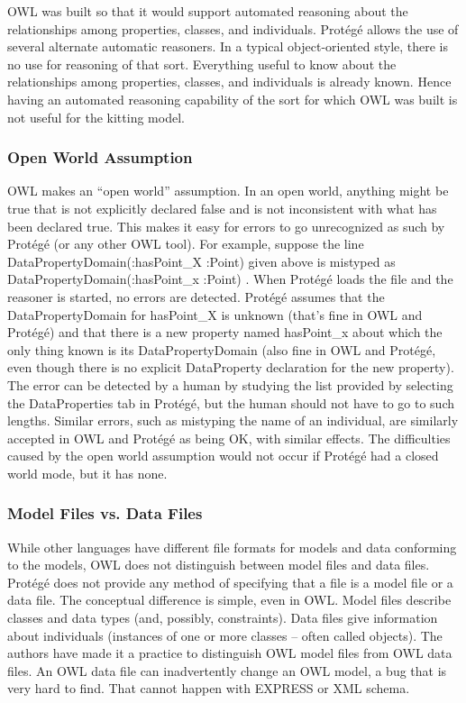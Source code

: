 OWL was built so that it would support automated reasoning about the
relationships among properties, classes, and individuals.  Prot\'{e}g\'{e} allows
the use of several alternate automatic reasoners. In a typical
object-oriented style, there is no use for reasoning of that sort.
Everything useful to know about the relationships among properties,
classes, and individuals is already known. Hence having an automated
reasoning capability of the sort for which OWL was built is not useful
for the kitting model.\\

\subsubsection{Open World Assumption}

OWL makes an ``open world'' assumption.  In an open world, anything might
be true that is not explicitly declared false and is not inconsistent with
what has been declared true. This makes it easy for errors to go
unrecognized as such by  Prot\'{e}g\'{e} (or any other OWL tool). For example,
suppose the line \sf DataPropertyDomain(:hasPoint\_X :Point) \rm given
above is mistyped as \sf DataPropertyDomain(:hasPoint\_x :Point) \rm. When
 Prot\'{e}g\'{e} loads the file and the reasoner is started, no errors are
detected.  Prot\'{e}g\'{e} assumes that the DataPropertyDomain for \sf hasPoint\_X
\rm is unknown (that's fine in OWL and  Prot\'{e}g\'{e}) and that there is a new
property named \sf hasPoint\_x \rm about which the only thing known is its
DataPropertyDomain (also fine in OWL and  Prot\'{e}g\'{e}, even though there is no
explicit DataProperty declaration for the new property). The error can be
detected by a human by studying the list provided by selecting the
DataProperties tab in  Prot\'{e}g\'{e}, but the human should not have to go to such
lengths. Similar errors, such as mistyping the name of an individual, are
similarly accepted in OWL and  Prot\'{e}g\'{e} as being OK, with similar effects.
The difficulties caused by the open world assumption would not occur if
 Prot\'{e}g\'{e} had a closed world mode, but it has none.\\

\subsubsection{Model Files vs. Data Files}

While other languages have different file formats for models and
data conforming to the models, OWL does not distinguish between model files
and data files.  Prot\'{e}g\'{e} does not provide any method of specifying that a
file is a model file or a data file. The conceptual difference is simple,
even in OWL. Model files describe classes and data types (and, possibly,
constraints). Data files give information about individuals (instances of
one or more classes -- often called objects). The authors have made it a
practice to distinguish OWL model files from OWL data files. An OWL data
file can inadvertently change an OWL model, a bug that is very hard to
find. That cannot happen with EXPRESS or XML schema.\\

